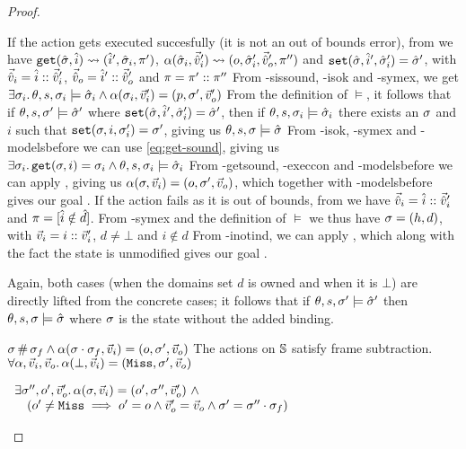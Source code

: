 \begin{proof}
\begin{hypvlist}
 If the action gets executed succesfully (it is not an out of bounds error), from  we have $\texttt{get}(\hat{\sigma},\hat{i})\rightsquigarrow(\hat{i}',\hat{\sigma}_i,\pi')$, $\alpha(\hat{\sigma}_i,\vec{\hat{v}}_i')\rightsquigarrow(o,\hat{\sigma}'_i,\vec{\hat{v}}_o',\pi'')$ and ${\texttt{set}(\hat{\sigma},\hat{i}',\hat{\sigma}'_i)=\hat{\sigma}'}$, with $\vec{\hat{v}}_i=\hat{i}::\vec{\hat{v}}_i'$, $\vec{\hat{v}}_o=\hat{i}'::\vec{\hat{v}}_o'$ and $\pi=\pi'::\pi''$
 From \hyp{sissound}, \hyp{isok} and \hyp{symex}, we get $\exists \sigma_i\ldotp \theta,s,\sigma_i\models\hat{\sigma}_i \land \alpha(\sigma_i,\vec{v}_i')=(p,\sigma',\vec{v}_o')$
 From the definition of $\models$, it follows that if $\theta,s,\sigma'\models\hat{\sigma}'$ where $\texttt{set}(\hat{\sigma},\hat{i}',\hat{\sigma}'_i)=\hat{\sigma}'$, then if $\theta,s,\sigma_i\models\hat{\sigma}_i$ there exists an $\sigma$ and $i$ such that $\texttt{set}(\sigma,i,\sigma_i')=\sigma'$, giving us $\theta,s,\sigma\models\hat{\sigma}$
 From \hyp{isok}, \hyp{symex} and \hyp{modelsbefore} we can use \ref{eq:get-sound}, giving us ${\exists \sigma_i \ldotp \texttt{get}(\sigma, i)=\sigma_i} \land \theta,s,\sigma_i \models \hat{\sigma}_i$%
 From \hyp{getsound}, \hyp{execcon} and \hyp{modelsbefore} we can apply , giving us ${\alpha(\sigma,\vec{v}_i)=(o,\sigma',\vec{v}_o)}$, which together with \hyp{modelsbefore} gives our goal .
 If the action fails as it is out of bounds, from  we have $\vec{\hat{v}}_i=\hat{i}::\vec{\hat{v}}_i'$ and $\pi=[\hat{i}\notin \hat{d}]$.
 From \hyp{symex} and the definition of $\models$ we thus have $\sigma=(h,d)$, with $\vec{v}_i=i::\vec{v}_i'$, $d\neq\bot$ and $i\notin d$
 From \hyp{inotind}, we can apply , which along with the fact the state is unmodified gives our goal .
\end{hypvlist}

\pfcase{$\alpha=\alloc$}

Again, both cases (when the domains set $d$ is owned and when it is $\bot$) are directly lifted from the concrete cases; it follows that if $\theta,s,\sigma'\models\hat{\sigma}'$ then $\theta,s,\sigma\models\hat{\sigma}$ where $\sigma$ is the state without the added binding.


\pfassume \begin{hypvlist}
 $\sigma\operatorname{\#}\sigma_f \land \alpha(\sigma\cdot\sigma_f,\vec{v}_i)=(o,\sigma',\vec{v}_o)$
 The actions on $\mathbb S$ satisfy frame subtraction.
 $\forall \alpha, \vec{v}_i, \vec{v}_o\ldotp \alpha(\bot,\vec{v}_i)=(\texttt{Miss},\sigma',\vec{v}_o)$
\end{hypvlist}
\pfprove \begin{goalvlist}
 $\begin{array}{l}
\exists \sigma'', o', \vec{v}_o'\ldotp \alpha(\sigma,\vec{v}_i)=(o', \sigma'', \vec{v}_o') ~\land \\
\quad(o' \neq \texttt{Miss} \implies o' = o \land  \vec{v}_o' = \vec{v}_o \land \sigma' = \sigma'' \cdot \sigma_f)
\end{array}$
\end{goalvlist}


\end{proof}
